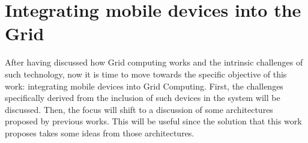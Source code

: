 \chapter{Integrating mobile devices into the Grid}\label{integrating_mobile_devices_into_the_grid}
After having discussed how Grid computing works and the intrinsic challenges of such technology, now it is time to move towards the specific objective of this work: integrating mobile devices into Grid Computing. First, the challenges specifically derived from the inclusion of such devices in the system will be discussed. Then, the focus will shift to a discussion of some architectures proposed by previous works. This will be useful since the solution that this work proposes takes some ideas from those architectures.


